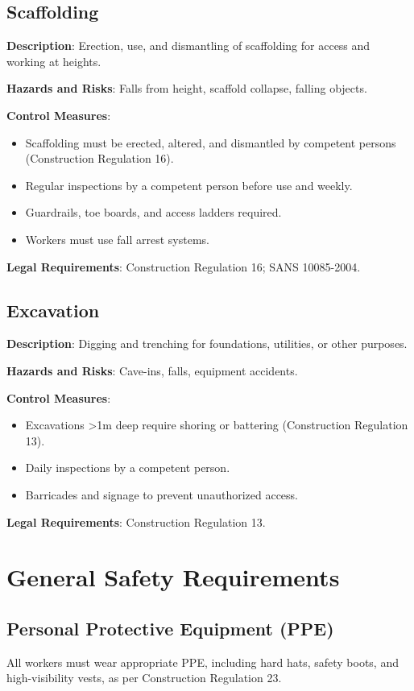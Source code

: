\documentclass[11pt]{article}
\def\activityExcavation{}
\begin{document}
\subsection{Scaffolding}
\textbf{Description}: Erection, use, and dismantling of scaffolding for access and working at heights.

\textbf{Hazards and Risks}: Falls from height, scaffold collapse, falling objects.

\textbf{Control Measures}:
\begin{itemize}
  \item Scaffolding must be erected, altered, and dismantled by competent persons (Construction Regulation 16).
  \item Regular inspections by a competent person before use and weekly.
  \item Guardrails, toe boards, and access ladders required.
  \item Workers must use fall arrest systems.
\end{itemize}

\textbf{Legal Requirements}: Construction Regulation 16; SANS 10085-2004.
\fi

\ifdefined\activityExcavation
\subsection{Excavation}
\textbf{Description}: Digging and trenching for foundations, utilities, or other purposes.

\textbf{Hazards and Risks}: Cave-ins, falls, equipment accidents.

\textbf{Control Measures}:
\begin{itemize}
  \item Excavations >1m deep require shoring or battering (Construction Regulation 13).
  \item Daily inspections by a competent person.
  \item Barricades and signage to prevent unauthorized access.
\end{itemize}

\textbf{Legal Requirements}: Construction Regulation 13.
\fi

\section{General Safety Requirements}
\subsection{Personal Protective Equipment (PPE)}
All workers must wear appropriate PPE, including hard hats, safety boots, and high-visibility vests, as per Construction Regulation 23.
\end{document}
